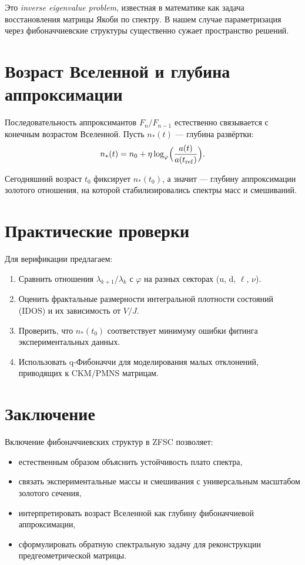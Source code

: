 \documentclass[12pt,a4paper]{article}
\begin{document}
Это \emph{inverse eigenvalue problem}, известная в математике как задача восстановления матрицы Якоби по спектру. В нашем случае параметризация через фибоначчиевские структуры существенно сужает пространство решений.

\section{Возраст Вселенной и глубина аппроксимации}
Последовательность аппроксимантов $F_n/F_{n-1}$ естественно связывается с конечным возрастом Вселенной. Пусть $n_*(t)$ — глубина развёртки:
\[
n_*(t) = n_0 + \eta \log_{\varphi}\!\Big(\frac{a(t)}{a(t_{\rm ref})}\Big).
\]

Сегодняшний возраст $t_0$ фиксирует $n_*(t_0)$, а значит — глубину аппроксимации золотого отношения, на которой стабилизировались спектры масс и смешиваний.

\section{Практические проверки}
Для верификации предлагаем:
\begin{enumerate}
    \item Сравнить отношения $\lambda_{k+1}/\lambda_k$ с $\varphi$ на разных секторах (u, d, $\ell$, $\nu$).
    \item Оценить фрактальные размерности интегральной плотности состояний (IDOS) и их зависимость от $V/J$.
    \item Проверить, что $n_*(t_0)$ соответствует минимуму ошибки фитинга экспериментальных данных.
    \item Использовать q-Фибоначчи для моделирования малых отклонений, приводящих к CKM/PMNS матрицам.
\end{enumerate}

\section{Заключение}
Включение фибоначчиевских структур в ZFSC позволяет:
\begin{itemize}
    \item естественным образом объяснить устойчивость плато спектра,
    \item связать экспериментальные массы и смешивания с универсальным масштабом золотого сечения,
    \item интерпретировать возраст Вселенной как глубину фибоначчиевой аппроксимации,
    \item сформулировать обратную спектральную задачу для реконструкции предгеометрической матрицы.
\end{itemize}
\end{document}
